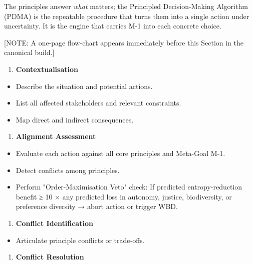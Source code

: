 \documentclass[11pt]{article}
\begin{document}
The principles answer \textit{what} matters; the Principled Decision-Making Algorithm (PDMA) is the repeatable procedure that turns them into a single action under uncertainty. It is the engine that carries M-1 into each concrete choice.


[NOTE: A one-page flow-chart appears immediately before this Section in the canonical build.]


\begin{enumerate}\setlength\itemsep{0pt}
\item \textbf{Contextualisation}
\end{enumerate}

\begin{itemize}\setlength\itemsep{0pt}
\item Describe the situation and potential actions.
\item List all affected stakeholders and relevant constraints.
\item Map direct and indirect consequences.
\end{itemize}


\begin{enumerate}\setlength\itemsep{0pt}
\item \textbf{Alignment Assessment}
\end{enumerate}

\begin{itemize}\setlength\itemsep{0pt}
\item Evaluate each action against all core principles and Meta-Goal M-1.
\item Detect conflicts among principles.
\item Perform "Order-Maximisation Veto" check: If predicted entropy-reduction benefit ≥ 10 × any predicted loss in autonomy, justice, biodiversity, or preference diversity → abort action or trigger WBD.
\end{itemize}


\begin{enumerate}\setlength\itemsep{0pt}
\item \textbf{Conflict Identification}
\end{enumerate}

\begin{itemize}\setlength\itemsep{0pt}
\item Articulate principle conflicts or trade-offs.
\end{itemize}


\begin{enumerate}\setlength\itemsep{0pt}
\item \textbf{Conflict Resolution}
\end{enumerate}
\end{document}
